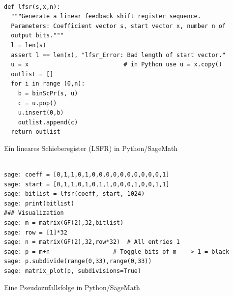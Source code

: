 \begin{refsegment}
\begin{sagecode}
\begin{verbatim}

def lfsr(s,x,n):
  """Generate a linear feedback shift register sequence.
  Parameters: Coefficient vector s, start vector x, number n of
  output bits."""
  l = len(s)
  assert l == len(x), "lfsr_Error: Bad length of start vector."
  u = x                           # in Python use u = x.copy()
  outlist = []
  for i in range (0,n):
    b = binScPr(s, u)
    c = u.pop()
    u.insert(0,b)
    outlist.append(c)
  return outlist
\end{verbatim}
\caption{Ein lineares
	Schieberegister (LSFR) in Python/SageMath}\label{Sage-code-bool-lfsr}
\end{sagecode}

\begin{sagecode}
\begin{verbatim}

sage: coeff = [0,1,1,0,1,0,0,0,0,0,0,0,0,0,0,1]
sage: start = [0,1,1,0,1,0,1,1,0,0,0,1,0,0,1,1]
sage: bitlist = lfsr(coeff, start, 1024)
sage: print(bitlist)
### Visualization
sage: m = matrix(GF(2),32,bitlist)
sage: row = [1]*32
sage: n = matrix(GF(2),32,row*32)  # All entries 1
sage: p = m+n                  # Toggle bits of m ---> 1 = black
sage: p.subdivide(range(0,33),range(0,33))
sage: matrix_plot(p, subdivisions=True)
\end{verbatim}
\caption{Eine Pseudozufallsfolge in Python/SageMath}\label{Sage-code-bool-lfsr1}
\end{sagecode}


\end{refsegment}

